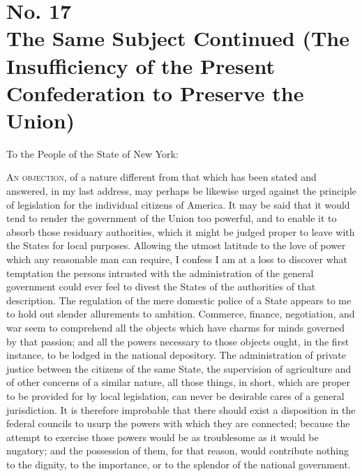 \chapter[No. 17: The Same Subject Continued (The Insufficiency of the Present Confederation to Preserve the Union)]{No. 17\\ {\small The Same Subject Continued (The Insufficiency of the Present Confederation to Preserve the Union)}}
To the People of the State of New York:
\vspace{.25cm}

\textsc{An objection}, of a nature different from that which has been stated and answered, in my last address, may perhaps be likewise urged against the principle of legislation for the individual citizens of America. It may be said that it would tend to render the government of the Union too powerful, and to enable it to absorb those residuary authorities, which it might be judged proper to leave with the States for local purposes. Allowing the utmost latitude to the love of power which any reasonable man can require, I confess I am at a loss to discover what temptation the persons intrusted with the administration of the general government could ever feel to divest the States of the authorities of that description. The regulation of the mere domestic police of a State appears to me to hold out slender allurements to ambition. Commerce, finance, negotiation, and war seem to comprehend all the objects which have charms for minds governed by that passion; and all the powers necessary to those objects ought, in the first instance, to be lodged in the national depository. The administration of private justice between the citizens of the same State, the supervision of agriculture and of other concerns of a similar nature, all those things, in short, which are proper to be provided for by local legislation, can never be desirable cares of a general jurisdiction. It is therefore improbable that there should exist a disposition in the federal councils to usurp the powers with which they are connected; because the attempt to exercise those powers would be as troublesome as it would be nugatory; and the possession of them, for that reason, would contribute nothing to the dignity, to the importance, or to the splendor of the national government.

